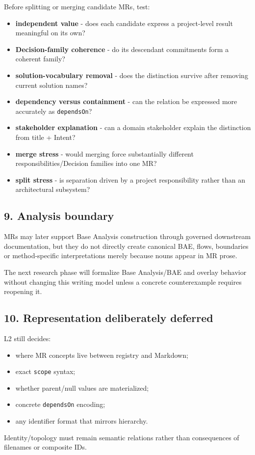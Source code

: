 \documentclass[
  10pt,
]{article}
\providecommand{\tightlist}{%
  \setlength{\itemsep}{0pt}\setlength{\parskip}{0pt}}
\begin{document}
Before splitting or merging candidate MRs, test:

\begin{itemize}
\tightlist
\item
  \textbf{independent value} - does each candidate express a
  project-level result meaningful on its own?
\item
  \textbf{Decision-family coherence} - do its descendant commitments
  form a coherent family?
\item
  \textbf{solution-vocabulary removal} - does the distinction survive
  after removing current solution names?
\item
  \textbf{dependency versus containment} - can the relation be expressed
  more accurately as \texttt{dependsOn}?
\item
  \textbf{stakeholder explanation} - can a domain stakeholder explain
  the distinction from title + Intent?
\item
  \textbf{merge stress} - would merging force substantially different
  responsibilities/Decision families into one MR?
\item
  \textbf{split stress} - is separation driven by a project
  responsibility rather than an architectural subsystem?
\end{itemize}

\subsection{9. Analysis boundary}\label{9-analysis-boundary}

MRs may later support Base Analysis construction through governed
downstream documentation, but they do not directly create canonical BAE,
flows, boundaries or method-specific interpretations merely because
nouns appear in MR prose.

The next research phase will formalize Base Analysis/BAE and overlay
behavior without changing this writing model unless a concrete
counterexample requires reopening it.

\subsection{10. Representation deliberately
deferred}\label{10-representation-deliberately-deferred}

L2 still decides:

\begin{itemize}
\tightlist
\item
  where MR concepts live between registry and Markdown;
\item
  exact \texttt{scope} syntax;
\item
  whether parent/null values are materialized;
\item
  concrete \texttt{dependsOn} encoding;
\item
  any identifier format that mirrors hierarchy.
\end{itemize}

Identity/topology must remain semantic relations rather than
consequences of filenames or composite IDs.
\end{document}
